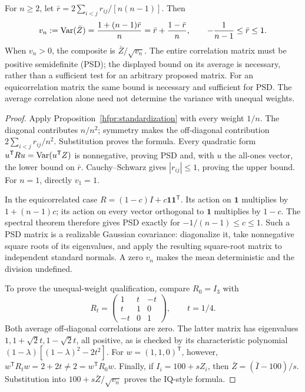 \begin{proposition}
\label{hfpr:equal-weights}
For \(n\geq2\), let \(\bar r=2\sum_{i<j}r_{ij}/[n(n-1)]\). Then
\[
 v_n:=\operatorname{Var}(\bar Z)=\frac{1+(n-1)\bar r}{n}
 =\bar r+\frac{1-\bar r}{n},\qquad
 -\frac1{n-1}\leq\bar r\leq1.
\]
When \(v_n>0\), the composite is \(\bar Z/\sqrt{v_n}\).
The entire correlation matrix must be positive semidefinite (PSD);
the displayed bound on its average is necessary, rather than a sufficient
test for an arbitrary proposed matrix. For an equicorrelation matrix the
same bound is necessary and sufficient for PSD. The average correlation
alone need not determine the variance with unequal weights.
\end{proposition}
\begin{proof}
Apply Proposition~\ref{hfpr:standardization} with every weight \(1/n\).
The diagonal contributes \(n/n^2\); symmetry makes the off-diagonal
contribution \(2\sum_{i<j}r_{ij}/n^2\). Substitution proves the formula.
Every quadratic form \(u^{\mathsf T}Ru=\operatorname{Var}(u^{\mathsf T}Z)\) is
nonnegative, proving PSD and, with \(u\) the all-ones vector, the lower
bound on \(\bar r\). Cauchy--Schwarz gives \(|r_{ij}|\leq1\), proving
the upper bound. For \(n=1\), directly \(v_1=1\).

In the equicorrelated case \(R=(1-c)I+c\mathbf1\mathbf1^{\mathsf T}\).
Its action on \(\mathbf1\) multiplies by \(1+(n-1)c\); its action
on every vector orthogonal to \(\mathbf1\) multiplies by \(1-c\).
The spectral theorem therefore gives PSD exactly for
\(-1/(n-1)\leq c\leq1\). Such a PSD matrix is a realizable Gaussian
covariance: diagonalize it, take nonnegative square roots of its
eigenvalues, and apply the resulting square-root matrix to independent
standard normals. A zero \(v_n\) makes the mean deterministic and the
division undefined.

To prove the unequal-weight qualification, compare \(R_0=I_3\) with
\[
 R_t=\begin{pmatrix}1&t&-t\\t&1&0\\-t&0&1\end{pmatrix},\qquad t=1/4.
\]
Both average off-diagonal correlations are zero. The latter matrix has
eigenvalues \(1,1+\sqrt2t,1-\sqrt2t\), all positive, as is checked
by its characteristic polynomial
\((1-\lambda)[(1-\lambda)^2-2t^2]\).
For \(w=(1,1,0)^{\mathsf T}\), however,
\(w^{\mathsf T}R_tw=2+2t\ne2=w^{\mathsf T}R_0w\).
Finally, if \(I_i=100+sZ_i\), then
\(\bar Z=(\bar I-100)/s\). Substitution into
\(100+s\bar Z/\sqrt{v_n}\) proves the IQ-style formula.
\end{proof}

